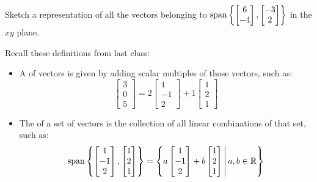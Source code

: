 \begin{activity}{5}
    Sketch a representation of all the vectors belonging to
    \(\operatorname{span}\left\{\begin{bmatrix}6\\-4\end{bmatrix},
     \begin{bmatrix}-3\\2\end{bmatrix}\right\}\)
    in the \(xy\) plane.
\end{activity}



\begin{remark}
	Recall these definitions from last class:
\begin{itemize}
	\item
  A  of vectors is given by adding scalar
  multiples of those vectors, such as:
  \[
    \begin{bmatrix} 3 \\ 0 \\ 5 \end{bmatrix} =
    2 \begin{bmatrix} 1 \\ -1 \\ 2 \end{bmatrix} +
    1\begin{bmatrix} 1 \\ 2 \\ 1 \end{bmatrix}
  \]

\item The  of a set of vectors is the collection of all linear
  combinations of that set, such as:
  \[
    \operatorname{span}\left\{
      \begin{bmatrix} 1 \\ -1 \\ 2 \end{bmatrix},
      \begin{bmatrix} 1 \\ 2 \\ 1 \end{bmatrix}
    \right\} = \left\{
      a\begin{bmatrix} 1 \\ -1 \\ 2 \end{bmatrix}+
      b\begin{bmatrix} 1 \\ 2 \\ 1 \end{bmatrix}
    \,\middle|\,
      a,b\in\mathbb{R}
    \right\}
  \]
 \end{itemize}
\end{remark}


